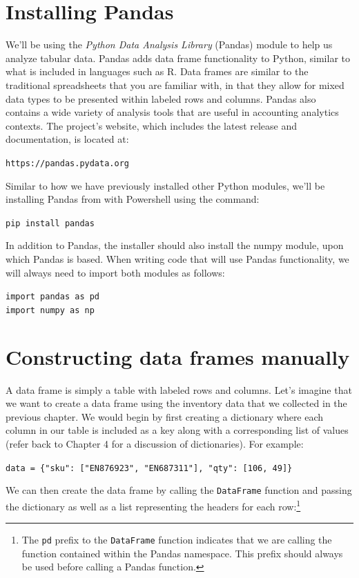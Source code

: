 \documentclass{book}
\begin{document}
\section{Installing Pandas}
We'll be using the \textit{Python Data Analysis Library} (Pandas) module to help us analyze tabular data. Pandas adds data frame functionality to Python, similar to what is included in languages such as R. Data frames are similar to the traditional spreadsheets that you are familiar with, in that they allow for mixed data types to be presented within labeled rows and columns. Pandas also contains a wide variety of analysis tools that are useful in accounting analytics contexts. The project's website, which includes the latest release and documentation, is located at:

\texttt{https://pandas.pydata.org}

Similar to how we have previously installed other Python modules, we'll be installing Pandas from with Powershell using the command:

\texttt{pip install pandas}

In addition to Pandas, the installer should also install the numpy module, upon which Pandas is based. When writing code that will use Pandas functionality, we will always need to import both modules as follows:

\texttt{import pandas as pd \\ import numpy as np}

\section{Constructing data frames manually}
A data frame is simply a table with labeled rows and columns. Let's imagine that we want to create a data frame using the inventory data that we collected in the previous chapter. We would begin by first creating a dictionary where each column in our table is included as a key along with a corresponding list of values (refer back to Chapter 4 for a discussion of dictionaries). For example:

\texttt{data = \{"sku": ["EN876923", "EN687311"], "qty": [106, 49]\}}

We can then create the data frame by calling the \texttt{DataFrame} function and passing the dictionary as well as a list representing the headers for each row:\footnote{The \texttt{pd} prefix to the \texttt{DataFrame} function indicates that we are calling the function contained within the Pandas namespace. This prefix should always be used before calling a Pandas function.}
\end{document}
